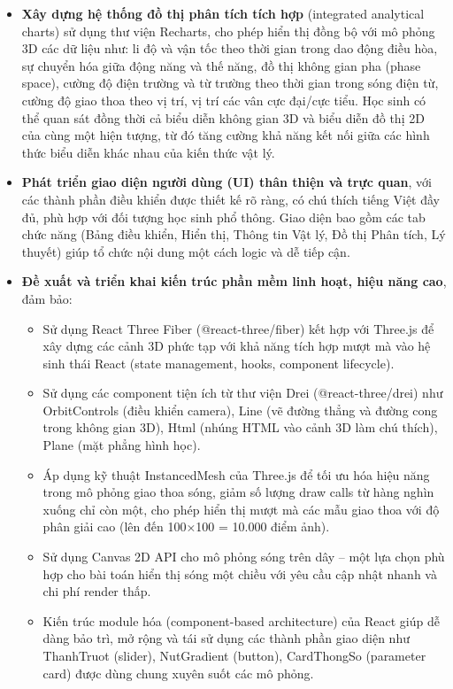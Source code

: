 \begin{itemize}
    \item \textbf{Xây dựng hệ thống đồ thị phân tích tích hợp} (integrated analytical charts) sử dụng thư viện Recharts, cho phép hiển thị đồng bộ với mô phỏng 3D các dữ liệu như: li độ và vận tốc theo thời gian trong dao động điều hòa, sự chuyển hóa giữa động năng và thế năng, đồ thị không gian pha (phase space), cường độ điện trường và từ trường theo thời gian trong sóng điện từ, cường độ giao thoa theo vị trí, vị trí các vân cực đại/cực tiểu. Học sinh có thể quan sát đồng thời cả biểu diễn không gian 3D và biểu diễn đồ thị 2D của cùng một hiện tượng, từ đó tăng cường khả năng kết nối giữa các hình thức biểu diễn khác nhau của kiến thức vật lý.
    
    \item \textbf{Phát triển giao diện người dùng (UI) thân thiện và trực quan}, với các thành phần điều khiển được thiết kế rõ ràng, có chú thích tiếng Việt đầy đủ, phù hợp với đối tượng học sinh phổ thông. Giao diện bao gồm các tab chức năng (Bảng điều khiển, Hiển thị, Thông tin Vật lý, Đồ thị Phân tích, Lý thuyết) giúp tổ chức nội dung một cách logic và dễ tiếp cận.
    
    \item \textbf{Đề xuất và triển khai kiến trúc phần mềm linh hoạt, hiệu năng cao}, đảm bảo:
    \begin{itemize}
        \item Sử dụng React Three Fiber (@react-three/fiber) kết hợp với Three.js để xây dựng các cảnh 3D phức tạp với khả năng tích hợp mượt mà vào hệ sinh thái React (state management, hooks, component lifecycle).
        \item Sử dụng các component tiện ích từ thư viện Drei (@react-three/drei) như OrbitControls (điều khiển camera), Line (vẽ đường thẳng và đường cong trong không gian 3D), Html (nhúng HTML vào cảnh 3D làm chú thích), Plane (mặt phẳng hình học).
        \item Áp dụng kỹ thuật InstancedMesh của Three.js để tối ưu hóa hiệu năng trong mô phỏng giao thoa sóng, giảm số lượng draw calls từ hàng nghìn xuống chỉ còn một, cho phép hiển thị mượt mà các mẫu giao thoa với độ phân giải cao (lên đến 100×100 = 10.000 điểm ảnh).
        \item Sử dụng Canvas 2D API cho mô phỏng sóng trên dây – một lựa chọn phù hợp cho bài toán hiển thị sóng một chiều với yêu cầu cập nhật nhanh và chi phí render thấp.
        \item Kiến trúc module hóa (component-based architecture) của React giúp dễ dàng bảo trì, mở rộng và tái sử dụng các thành phần giao diện như ThanhTruot (slider), NutGradient (button), CardThongSo (parameter card) được dùng chung xuyên suốt các mô phỏng.
    \end{itemize}
\end{itemize}

